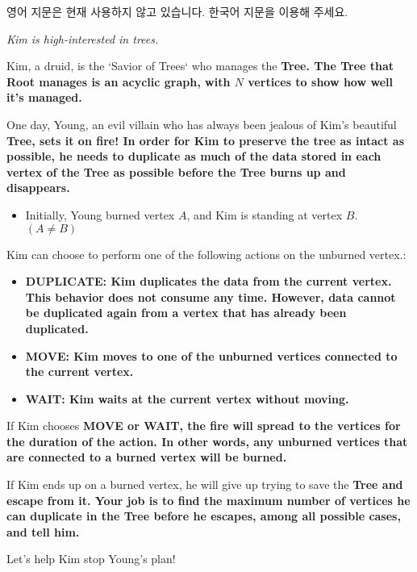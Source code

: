 영어 지문은 현재 사용하지 않고 있습니다.
한국어 지문을 이용해 주세요.


  \it{Kim is high-interested in trees.}


Kim, a druid, is the `Savior of Trees` who manages the \bf{Tree}. The \bf{Tree} that Root manages is an acyclic graph, with $N$ vertices to show how well it's managed. 


One day, Young, an evil villain who has always been jealous of Kim's beautiful \bf{Tree}, sets it on fire! In order for Kim to preserve the \bf{tree} as intact as possible, he needs to duplicate as much of the data stored in each vertex of the \bf{Tree} as possible before the \bf{Tree} burns up and disappears.


\begin{itemize}
  \item Initially, Young burned vertex $A$, and Kim is standing at vertex $B$. $(A \neq B)$
\end{itemize}


Kim can choose to perform one of the following actions on the unburned vertex.:


\begin{itemize}
  \item \bf{DUPLICATE}: Kim duplicates the data from the current vertex. This behavior does not consume any time. However, data cannot be duplicated again from a vertex that has already been duplicated.
  \item \bf{MOVE}: Kim moves to one of the unburned vertices connected to the current vertex.
  \item \bf{WAIT}: Kim waits at the current vertex without moving.
\end{itemize}


If Kim chooses \bf{MOVE} or \bf{WAIT}, the fire will spread to the vertices for the duration of the action. In other words, any unburned vertices that are connected to a burned vertex will be burned.


If Kim ends up on a burned vertex, he will give up trying to save the \bf{Tree} and escape from it. Your job is to find the maximum number of vertices he can duplicate in the \bf{Tree} before he escapes, among all possible cases, and tell him.


Let's help Kim stop Young's plan!
